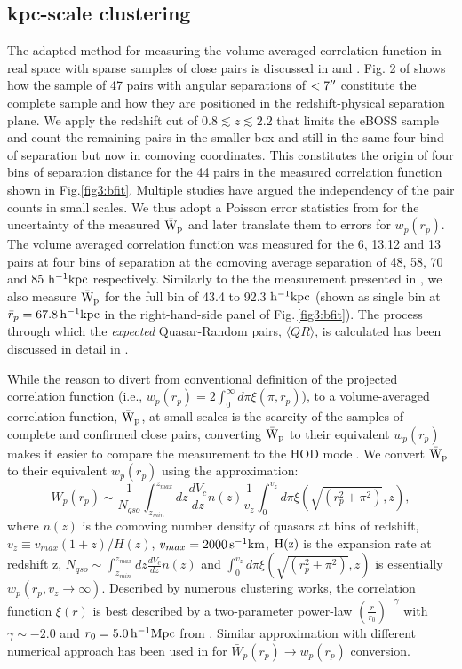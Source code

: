 \documentclass[useAMS,usenatbib]{mn2e}
\begin{document}
\subsection{kpc-scale clustering}\label{kpcls}
The adapted method for measuring the volume-averaged correlation function in real space with sparse samples of close pairs is discussed in \citet{ef17} and \citet{Hen06}. Fig. 2 of \citet{ef17} shows how the sample of 47 pairs with angular separations of $<7\arcsec$ constitute the complete sample and how they are positioned in the redshift-physical separation plane. We apply the redshift cut of $0.8 \lesssim z \lesssim 2.2$ that limits the eBOSS sample and count the remaining pairs in the smaller box and still in the same four bind of separation but now in comoving coordinates. This constitutes the origin of four bins of separation distance for the 44 pairs in the measured correlation function shown in Fig.\ref{fig3:bfit}. Multiple studies have argued the independency of the pair counts in small scales. We thus adopt a Poisson error statistics from \citet{geh88} for the uncertainty of the measured $\rm \bar W_p$ and later translate them to errors for $w_p(r_p)$. The volume averaged correlation function was measured for the 6, 13,12 and 13 pairs at four bins of separation at the comoving average separation of 48, 58, 70 and 85 $\rm h^{-1} kpc$ respectively. Similarly to the the measurement presented in \citet{ef17}, we also measure $\rm \bar W_p$ for the full bin of 43.4 to 92.3 $\rm h^{-1} kpc$ (shown as single bin at $\bar r_p = 67.8 \, \rm h^{-1} kpc$ in the right-hand-side panel of Fig.\,\ref{fig3:bfit}). The process through which the {\it expected} Quasar-Random pairs, $\langle QR \rangle$, is calculated has been discussed in detail in \citet{ef17}. 

While the reason to divert from conventional definition of the projected 
correlation function (i.e., $w_p(r_p)=2\int_{0}^{\infty} d\pi \xi(\pi, r_p)$), to a volume-averaged correlation function, 
$\rm \bar W_p$, at small scales is the scarcity of the samples of complete and 
confirmed close pairs, converting $\rm \bar W_p$ to their equivalent $w_p(r_p)$ makes it easier to compare the measurement to the HOD model. 
 We convert $\rm \bar W_p$ to their equivalent $w_p(r_p)$ using the approximation:
\begin{equation}
 \bar W_p(r_p) \sim \frac{1}{N_{qso}} \int_{z_{min}}^{z_{max}} dz \frac{dV_c}{dz} n(z) \frac{1}{v_z} \int_{0}^{v_z} d\pi \xi(\sqrt{\left(r_p^2+\pi^2\right)},z),
\end{equation}
where $n(z)$ is the comoving number density of quasars at bins of redshift, $v_z \equiv v_{max}(1+z)/H(z)$, $v_{max}= 2000 \, \rm s^{-1}km$, $\rm H(z)$ is the expansion rate at redshift z, $N_{qso} \sim \int_{z_{min}}^{z_{max}} dz \frac{dV_c}{dz} n(z)$ and $\int_{0}^{v_z} d\pi \xi(\sqrt{\left(r_p^2+\pi^2 \right)},z)$ is essentially $w_p(r_p, v_z \rightarrow \infty)$. Described by numerous clustering works, the correlation function $\xi(r)$ is best described by a two-parameter power-law $(\frac{r}{r_0})^{-\gamma}$ with $\gamma \sim -2.0$ and $r_0=5.0 \,  \rm h^{-1} Mpc$ from \citet{ef17}. Similar approximation with different numerical approach has been used in \citet{ko12} for $ \bar W_p(r_p) \rightarrow w_p(r_p)$ conversion.
\end{document}
